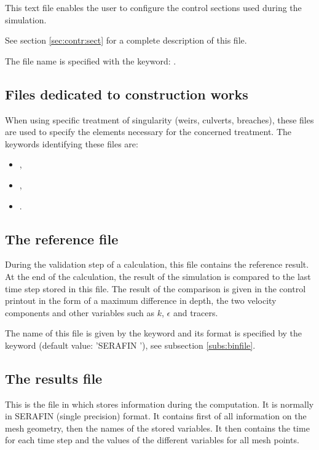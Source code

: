 This text file enables the user to configure the control sections used
during the simulation.

See section \ref{sec:contr:sect} for a complete description of this file.

The file name is specified with the keyword: .


\subsection{Files dedicated to construction works}

When using specific treatment of singularity (weirs, culverts, breaches), these
files are used to specify the elements necessary for the concerned treatment.
The keywords identifying these files are:

\begin{itemize}
\item {},


\item {},

\item {}.
\end{itemize}


\subsection{The reference file}

During the validation step of a calculation, this file contains the reference
result.
At the end of the calculation, the result of the simulation is compared to the
last time step stored in this file. The result of the comparison is given in
the control printout in the form of a maximum difference in depth,
the two velocity components and other variables such as $k$, $\epsilon$ and
tracers.

The name of this file is given by the keyword  and its
format is specified by the keyword  (default
value: 'SERAFIN '), see subsection \ref{subs:binfile}.


\subsection{The results file}

This is the file in which  stores information during the computation.
It is normally in SERAFIN (single precision) format.
It contains first of all information on the mesh geometry,
then the names of the stored variables.
It then contains the time for each time step and the values of the different
variables for all mesh points.

